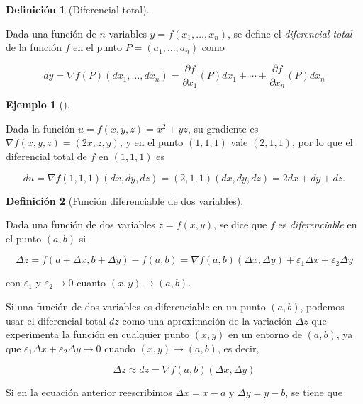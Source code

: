 \documentclass[
  a4paper,
]{scrreport}
\theoremstyle{plain}
\theoremstyle{definition}
\theoremstyle{plain}
\theoremstyle{plain}
\theoremstyle{definition}
\newtheorem{example}{Ejemplo}[chapter]
\theoremstyle{definition}
\newtheorem{definition}{Definición}[chapter]
\theoremstyle{remark}
\begin{document}
\begin{definition}[Diferencial
total]\protect\hypertarget{def-diferencial-total}{}\label{def-diferencial-total}

Dada una función de \(n\) variables \(y=f(x_1,\ldots,x_n)\), se define
el \emph{diferencial total} de la función \(f\) en el punto
\(P=(a_1, \ldots, a_n)\) como

\[
dy 
= \nabla f(P)(dx_1, \ldots, dx_n) 
= \frac{\partial f}{\partial x_1}(P)dx_1 + \cdots + \frac{\partial f}{\partial x_n}(P)dx_n
\]

\end{definition}

\begin{example}[]\protect\hypertarget{exm-diferencial-total}{}\label{exm-diferencial-total}

Dada la función \(u=f(x,y,z) = x^2+yz\), su gradiente es
\(\nabla f(x,y,z) = (2x, z, y)\), y en el punto \((1, 1, 1)\) vale
\((2, 1, 1)\), por lo que el diferencial total de \(f\) en \((1, 1, 1)\)
es

\[
du 
= \nabla f(1, 1, 1)(dx, dy, dz) 
= (2, 1, 1)(dx, dy, dz) 
= 2dx + dy + dz.
\]

\end{example}

\begin{definition}[Función diferenciable de dos
variables]\protect\hypertarget{def-funcion-2-variables-diferenciable}{}\label{def-funcion-2-variables-diferenciable}

Dada una función de dos variables \(z=f(x,y)\), se dice que \(f\) es
\emph{diferenciable} en el punto \((a,b)\) si

\[
\Delta z = f(a+\Delta x, b+\Delta y) - f(a,b) = \nabla f(a, b) (\Delta x, \Delta y) + \varepsilon_1 \Delta x + \varepsilon_2 \Delta y
\]

con \(\varepsilon_1\) y \(\varepsilon_2 \to 0\) cuanto
\((x,y)\to (a,b)\).

\end{definition}

Si una función de dos variables es diferenciable en un punto \((a,b)\),
podemos usar el diferencial total \(dz\) como una aproximación de la
variación \(\Delta z\) que experimenta la función en cualquier punto
\((x,y)\) en un entorno de \((a,b)\), ya que
\(\varepsilon_1 \Delta x + \varepsilon_2 \Delta y \to 0\) cuando
\((x,y)\to (a,b)\), es decir,

\[
\Delta z \approx dz = \nabla f(a, b) (\Delta x, \Delta y)
\]

Si en la ecuación anterior reescribimos \(\Delta x = x-a\) y
\(\Delta y = y-b\), se tiene que
\end{document}

